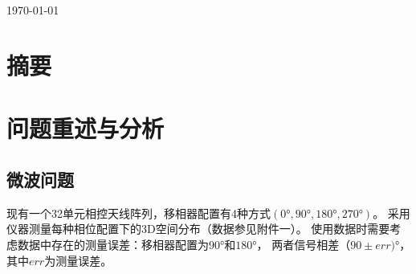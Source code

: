 \documentclass[UTF8,12pt]{ctexart}
\begin{document}
\begin{titlepage}
    \centering
    \\

    \\

    {\today}
\end{titlepage}
    



\tableofcontents



\section{摘要}




\section{问题重述与分析}
    \subsection{微波问题}
    现有一个32单元相控天线阵列，移相器配置有4种方式$(0°,90°,180°,270°)$。
    采用仪器测量每种相位配置下的3D空间分布（数据参见附件一）。
    使用数据时需要考虑数据中存在的测量误差：移相器配置为$90°$和$180°$，
    两者信号相差$（90±err)°$，其中$err$为测量误差。
\end{document}
